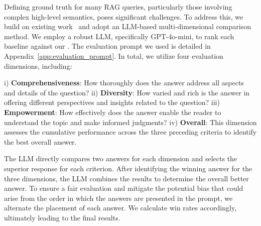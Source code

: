 Defining ground truth for many RAG queries, particularly those involving complex high-level semantics, poses significant challenges. To address this, we build on existing work~\citep{edge2024local} and adopt an LLM-based multi-dimensional comparison method. We employ a robust LLM, specifically GPT-4o-mini, to rank each baseline against our \model. The evaluation prompt we used is detailed in Appendix~\ref{app:evaluation_prompt}. In total, we utilize four evaluation dimensions, including:

i) \textbf{Comprehensiveness}: How thoroughly does the answer address all aspects and details of the question? ii) \textbf{Diversity}: How varied and rich is the answer in offering different perspectives and insights related to the question? iii) \textbf{Empowerment}: How effectively does the answer enable the reader to understand the topic and make informed judgments? iv) \textbf{Overall}: This dimension assesses the cumulative performance across the three preceding criteria to identify the best overall answer.

The LLM directly compares two answers for each dimension and selects the superior response for each criterion. After identifying the winning answer for the three dimensions, the LLM combines the results to determine the overall better answer. To ensure a fair evaluation and mitigate the potential bias that could arise from the order in which the answers are presented in the prompt, we alternate the placement of each answer. We calculate win rates accordingly, ultimately leading to the final results. 

